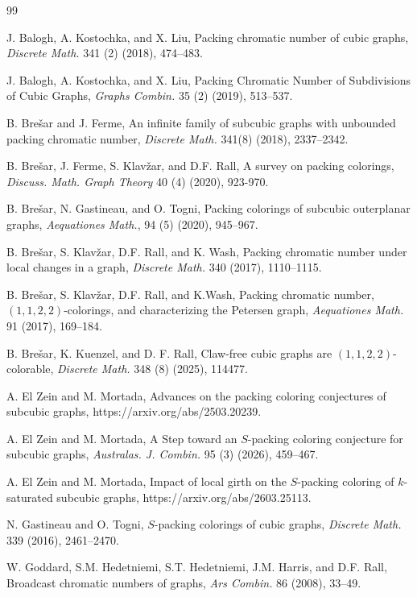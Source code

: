 \documentclass[12pt, oneside]{scrartcl}
\begin{document}
\begin{thebibliography}{99}

 J. Balogh, A. Kostochka, and X. Liu, Packing chromatic number of cubic graphs, \textit{Discrete Math.} 341 (2) (2018), 474--483.

 J. Balogh, A. Kostochka, and X. Liu, Packing Chromatic Number of Subdivisions of Cubic Graphs, \textit{Graphs Combin.} 35 (2) (2019), 513--537.

 B. Bre\v{s}ar and J. Ferme, An infinite family of subcubic graphs with unbounded packing chromatic number, \textit{Discrete Math.} 341(8) (2018), 2337--2342.

 B. Bre\v{s}ar, J. Ferme, S. Klavžar, and D.F. Rall, A survey on packing colorings, \textit{Discuss. Math. Graph Theory} 40 (4) (2020), 923-970.
 
 B. Bre\v{s}ar, N. Gastineau, and O. Togni, Packing colorings of subcubic outerplanar graphs, \textit{Aequationes Math.}, 94 (5) (2020), 945--967. 
 
 B. Bre\v{s}ar, S. Klav\v{z}ar, D.F. Rall, and K. Wash, Packing chromatic number under local changes in a graph, \textit{Discrete Math.} 340 (2017), 1110--1115.
  
 B. Bre\v{s}ar, S. Klav\v{z}ar, D.F. Rall, and K.Wash, Packing chromatic number, $(1,1,2,2)$-colorings, and characterizing the Petersen graph, \textit{Aequationes Math.} 91 (2017), 169--184.

 B. Brešar, K. Kuenzel, and D. F. Rall, Claw-free cubic graphs are $(1, 1, 2, 2)$-colorable, \textit{Discrete Math.} 348 (8) (2025), 114477.

 A. El Zein and M. Mortada, Advances on the packing coloring conjectures of subcubic graphs, https://arxiv.org/abs/2503.20239.

 A. El Zein and M. Mortada, A Step toward an $S$-packing coloring conjecture for subcubic graphs, \textit{Australas. J. Combin.} 95 (3) (2026), 459--467.

 A. El Zein and M. Mortada, Impact of local girth on the $S$-packing coloring of $k$-saturated subcubic graphs, https://arxiv.org/abs/2603.25113.

 N. Gastineau and O. Togni, $S$-packing colorings of cubic graphs, \textit{Discrete Math.} 339 (2016), 2461--2470.

 W. Goddard, S.M. Hedetniemi, S.T. Hedetniemi, J.M. Harris, and D.F. Rall, Broadcast chromatic numbers of graphs, \textit{Ars Combin.} 86 (2008), 33--49. 


\end{thebibliography}
\end{document}
